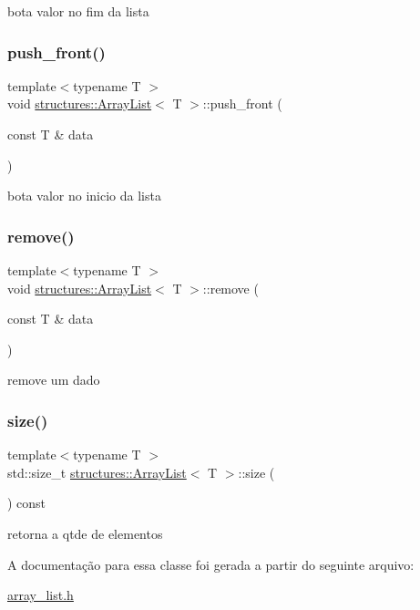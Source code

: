 bota valor no fim da lista 

\mbox{\label{classstructures_1_1ArrayList_a3920da2ade2ac6d1045f464d71a4f745}} 
\subsubsection{\texorpdfstring{push\_front()}{push\_front()}}
{\footnotesize\ttfamily template$<$typename T $>$ \\
void \mbox{\hyperlink{classstructures_1_1ArrayList}{structures\+::\+Array\+List}}$<$ T $>$\+::push\+\_\+front (\begin{DoxyParamCaption}\item[{const T \&}]{data }\end{DoxyParamCaption})}



bota valor no inicio da lista 

\mbox{\label{classstructures_1_1ArrayList_a50206e6cd81935fc838f6fb45cfd9a7d}} 
\subsubsection{\texorpdfstring{remove()}{remove()}}
{\footnotesize\ttfamily template$<$typename T $>$ \\
void \mbox{\hyperlink{classstructures_1_1ArrayList}{structures\+::\+Array\+List}}$<$ T $>$\+::remove (\begin{DoxyParamCaption}\item[{const T \&}]{data }\end{DoxyParamCaption})}



remove um dado 

\mbox{\label{classstructures_1_1ArrayList_ab3ed0971900e42d5009992a2e381a95a}} 
\subsubsection{\texorpdfstring{size()}{size()}}
{\footnotesize\ttfamily template$<$typename T $>$ \\
std\+::size\+\_\+t \mbox{\hyperlink{classstructures_1_1ArrayList}{structures\+::\+Array\+List}}$<$ T $>$\+::size (\begin{DoxyParamCaption}{ }\end{DoxyParamCaption}) const}



retorna a qtde de elementos 



A documentação para essa classe foi gerada a partir do seguinte arquivo\+:\begin{DoxyCompactItemize}
\item 
\mbox{\hyperlink{array__list_8h}{array\+\_\+list.\+h}}\end{DoxyCompactItemize}
